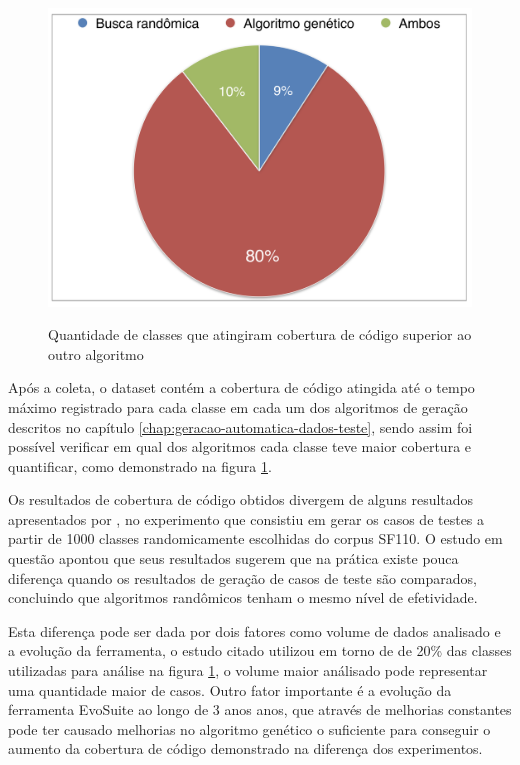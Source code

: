 \documentclass[
	12pt,				%
	oneside,			%
	a4paper,			%
	english,			%
	brazil				%
	]{abntex2ppgsi}
\begin{document}
\begin{figure}[H]%
	\centering
 	  \caption{Quantidade de classes que atingiram cobertura de código superior ao outro algoritmo}
		\includegraphics[width=\textwidth]{cobertura_evosuite.png}
	\label{fig:distribuicao-cobertura-evosuite}
\end{figure}

Após a coleta, o dataset contém a cobertura de código atingida até o tempo máximo registrado para cada classe em cada um dos algoritmos de geração descritos no capítulo \autoref{chap:geracao-automatica-dados-teste}, sendo assim foi possível verificar em qual dos algoritmos cada classe teve maior cobertura e quantificar, como demonstrado na figura \ref{fig:distribuicao-cobertura-evosuite}. 

Os resultados de cobertura de código obtidos divergem de alguns resultados apresentados por \cite{shamriski20151115}, no experimento que consistiu em gerar os casos de testes a partir de 1000 classes randomicamente escolhidas do corpus SF110. O estudo em questão apontou que seus resultados sugerem que na prática existe pouca diferença quando os resultados de geração de casos de teste são comparados, concluindo que algoritmos randômicos tenham o mesmo nível de efetividade.

Esta diferença pode ser dada por dois fatores como volume de dados analisado e a evolução da ferramenta, o estudo citado utilizou em torno de de 20\% das classes utilizadas para análise na figura \ref{fig:distribuicao-cobertura-evosuite}, o volume maior análisado pode representar uma quantidade maior de casos. Outro fator importante é a evolução da ferramenta EvoSuite ao longo de 3 anos anos, que através de melhorias constantes pode ter causado melhorias no algoritmo genético o suficiente para conseguir o aumento da cobertura de código demonstrado na diferença dos experimentos.
\end{document}

